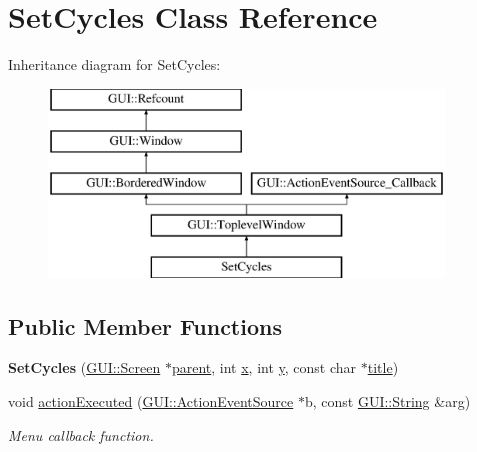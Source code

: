 \hypertarget{classSetCycles}{\section{Set\-Cycles Class Reference}
\label{classSetCycles}
}
Inheritance diagram for Set\-Cycles\-:\begin{figure}[H]
\begin{center}
\leavevmode
\includegraphics[height=5.000000cm]{classSetCycles}
\end{center}
\end{figure}
\subsection*{Public Member Functions}
\begin{DoxyCompactItemize}
\item 
\hypertarget{classSetCycles_a4eb745761f106c300a53f371b78c5254}{{\bfseries Set\-Cycles} (\hyperlink{classGUI_1_1Screen}{G\-U\-I\-::\-Screen} $\ast$\hyperlink{classGUI_1_1Window_a2e593ff65e7702178d82fe9010a0b539}{parent}, int \hyperlink{classGUI_1_1Window_a6ca6a80ca00c9e1d8ceea8d3d99a657d}{x}, int \hyperlink{classGUI_1_1Window_a0ee8e923aff2c3661fc2e17656d37adf}{y}, const char $\ast$\hyperlink{classGUI_1_1ToplevelWindow_a04de191f9a57b5b584657866a4ac6843}{title})}\label{classSetCycles_a4eb745761f106c300a53f371b78c5254}

\item 
\hypertarget{classSetCycles_af44270f3268432309501b4918facf28a}{void \hyperlink{classSetCycles_af44270f3268432309501b4918facf28a}{action\-Executed} (\hyperlink{classGUI_1_1ActionEventSource}{G\-U\-I\-::\-Action\-Event\-Source} $\ast$b, const \hyperlink{classGUI_1_1String}{G\-U\-I\-::\-String} \&arg)}\label{classSetCycles_af44270f3268432309501b4918facf28a}

\begin{DoxyCompactList}\small\item\em Menu callback function. \end{DoxyCompactList}\end{DoxyCompactItemize}

